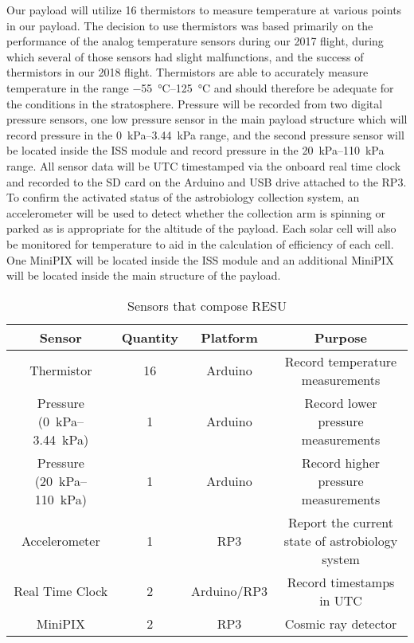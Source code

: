Our payload will utilize 16 thermistors to measure temperature at various points in our payload. The decision to use thermistors was based primarily on the performance of the analog temperature sensors during our 2017 flight, during which several of those sensors had slight malfunctions, and the success of thermistors in our 2018 flight. Thermistors are able to accurately measure temperature in the range \SIrange{-55}{125}{\celsius} and should therefore be adequate for the conditions in the stratosphere. Pressure will be recorded from two digital pressure sensors, one low pressure sensor in the main payload structure which will record pressure in the \SIrange{0}{3.44}{\kilo\pascal} range, and the second pressure sensor will be located inside the ISS module and record pressure in the \SIrange{20}{110}{\kilo\pascal} range. All sensor data will be UTC timestamped via the onboard real time clock and recorded to the SD card on the Arduino and USB drive attached to the RP3. To confirm the activated status of the astrobiology collection system, an accelerometer will be used to detect whether the collection arm is spinning or parked as is appropriate for the altitude of the payload. Each solar cell will also be monitored for temperature to aid in the calculation of efficiency of each cell. One MiniPIX will be located inside the ISS module and an additional MiniPIX will be located inside the main structure of the payload.

\begin{table}[h!]
\centering
\caption{Sensors that compose RESU}
\label{tab:Sensors}
\bigskip
\begin{tabular}{cccc}
  \hline
  \hline
  \multicolumn{1}{c}{\bfseries Sensor} & {\bfseries Quantity} & {\bfseries Platform} & {\bfseries Purpose} \\
  \hline
  Thermistor          		& 16 & Arduino  		& Record temperature measurements  \\
  Pressure (\SIrange{0}{3.44}{\kilo\pascal})        				& 1 & Arduino 		& Record lower pressure measurements \\
  Pressure (\SIrange{20}{110}{\kilo\pascal})        				& 1 & Arduino 		& Record higher pressure measurements \\
  Accelerometer       		& 1 & RP3    		& Report the current state of astrobiology system \\
  Real Time Clock 				& 2 & Arduino/RP3 	& Record timestamps in UTC \\
  MiniPIX         				& 2 & RP3     		& Cosmic ray detector \\
  \hline
  \hline
\end{tabular}
\end{table}


